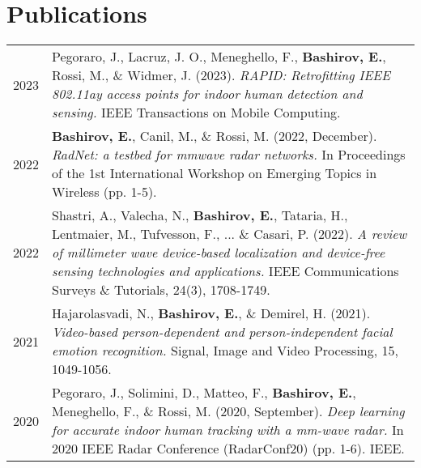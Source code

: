 \documentclass[lighthipster]{simplehipstercv}
\begin{document}
\section*{Publications}
\begin{tabular}{l | >{\footnotesize}p{}}

    2023 & Pegoraro, J., Lacruz, J. O., Meneghello, F., \textbf{Bashirov, E.}, Rossi, M., \& Widmer, J. (2023). \emph{RAPID: Retrofitting IEEE 802.11ay access points for indoor human detection and sensing.} IEEE Transactions on Mobile Computing. \\
    
    2022 & \textbf{Bashirov, E.}, Canil, M., \& Rossi, M. (2022, December). \emph{RadNet: a testbed for mmwave radar networks.} In Proceedings of the 1st International Workshop on Emerging Topics in Wireless (pp. 1-5). \\
    
    2022 & Shastri, A., Valecha, N., \textbf{Bashirov, E.}, Tataria, H., Lentmaier, M., Tufvesson, F., ... \& Casari, P. (2022). \emph{A review of millimeter wave device-based localization and device-free sensing technologies and applications.} IEEE Communications Surveys \& Tutorials, 24(3), 1708-1749. \\
    
    2021 & Hajarolasvadi, N., \textbf{Bashirov, E.}, \& Demirel, H. (2021). \emph{Video-based person-dependent and person-independent facial emotion recognition.} Signal, Image and Video Processing, 15, 1049-1056. \\

    2020 & Pegoraro, J., Solimini, D., Matteo, F., \textbf{Bashirov, E.}, Meneghello, F., \& Rossi, M. (2020, September). \emph{Deep learning for accurate indoor human tracking with a mm-wave radar.} In 2020 IEEE Radar Conference (RadarConf20) (pp. 1-6). IEEE. \\

\end{tabular}

\bigskip


\end{document}
